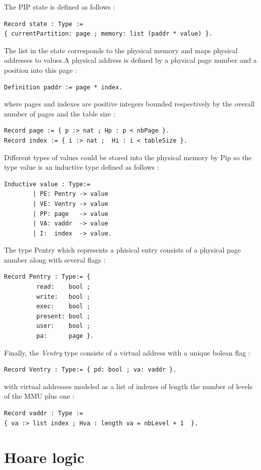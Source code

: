\noindent The PIP state is defined as follows :
\begin{lstlisting}[caption = {PIP state definition}] 
Record state : Type := 
{ currentPartition: page ; memory: list (paddr * value) }.
\end{lstlisting}
The list in the state corresponds to the physical memory and maps physical addresses to values.A physical address is defined by a physical page number and a position into this page :
\begin{lstlisting}[caption = {paddr type definition}] 
	    Definition paddr := page * index.
\end{lstlisting}
where pages and indexes are positive integers bounded respectively by the overall number of pages and the table size :
\begin{lstlisting}[caption = {page \& index type definitions}]
Record page := { p :> nat ; Hp : p < nbPage }. 
Record index := { i :> nat ;  Hi : i < tableSize }.
\end{lstlisting}
Different types of values could be stored into the physical memory by Pip so the type value is an inductive type defined as follows :
\begin{lstlisting}[caption = {value type definition}]
		Inductive value : Type:=
		| PE: Pentry -> value
		| VE: Ventry -> value
		| PP: page   -> value
		| VA: vaddr  -> value
		| I:  index  -> value.
\end{lstlisting}
The type Pentry which represents a phisical entry consists of a physical page number along with several flags :
\begin{lstlisting}[caption = {Pentry type definition}]
		Record Pentry : Type:= {
  		 read:    bool ;
   		 write:   bool ;
   		 exec:    bool ;
   		 present: bool ;
   		 user:    bool ;
   		 pa:      page }.
\end{lstlisting}
Finally, the \textit{Ventry} type consists of a virtual address with a unique bolean flag :
\begin{lstlisting}[caption = {Ventry type definition}]
Record Ventry : Type:= { pd: bool ; va: vaddr }.
\end{lstlisting}
with virtual addresses modeled as a list of indexes of length the number of levels of the MMU plus one :
\begin{lstlisting}[caption = {vaddr type definition}]
Record vaddr : Type := 
{ va :> list index ; Hva : length va = nbLevel + 1  }.
\end{lstlisting}

\section{Hoare logic} \label{Hoare}

